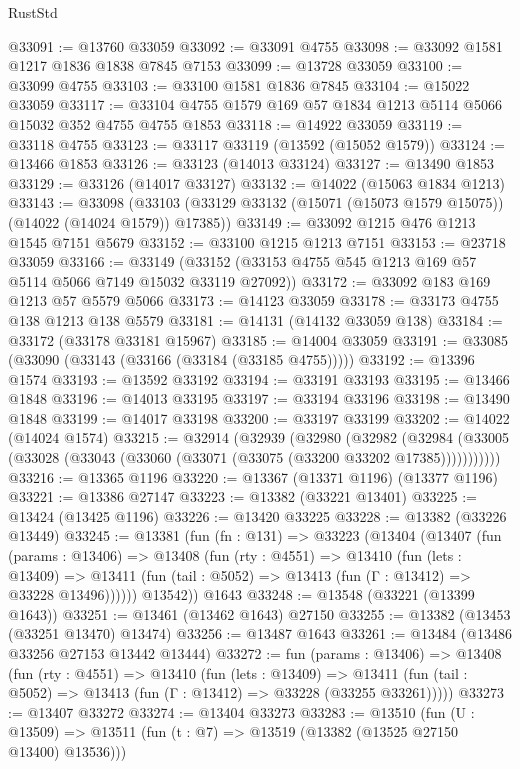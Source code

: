 \begin{lexlean}{RustStd}
\begin{coremodule}
@33091 := @13760 @33059
@33092 := @33091 @4755
@33098 := @33092 @1581 @1217 @1836 @1838 @7845 @7153
@33099 := @13728 @33059
@33100 := @33099 @4755
@33103 := @33100 @1581 @1836 @7845
@33104 := @15022 @33059
@33117 := @33104 @4755 @1579 @169 @57 @1834 @1213 @5114 @5066 @15032 @352 @4755 @4755 @1853
@33118 := @14922 @33059
@33119 := @33118 @4755
@33123 := @33117 @33119 (@13592 (@15052 @1579))
@33124 := @13466 @1853
@33126 := @33123 (@14013 @33124)
@33127 := @13490 @1853
@33129 := @33126 (@14017 @33127)
@33132 := @14022 (@15063 @1834 @1213)
@33143 := @33098
    (@33103 (@33129 @33132 (@15071 (@15073 @1579 @15075)) (@14022 (@14024 @1579)) @17385))
@33149 := @33092 @1215 @476 @1213 @1545 @7151 @5679
@33152 := @33100 @1215 @1213 @7151
@33153 := @23718 @33059
@33166 := @33149 (@33152 (@33153 @4755 @545 @1213 @169 @57 @5114 @5066 @7149 @15032 @33119 @27092))
@33172 := @33092 @183 @169 @1213 @57 @5579 @5066
@33173 := @14123 @33059
@33178 := @33173 @4755 @138 @1213 @138 @5579
@33181 := @14131 (@14132 @33059 @138)
@33184 := @33172 (@33178 @33181 @15967)
@33185 := @14004 @33059
@33191 := @33085 (@33090 (@33143 (@33166 (@33184 (@33185 @4755)))))
@33192 := @13396 @1574
@33193 := @13592 @33192
@33194 := @33191 @33193
@33195 := @13466 @1848
@33196 := @14013 @33195
@33197 := @33194 @33196
@33198 := @13490 @1848
@33199 := @14017 @33198
@33200 := @33197 @33199
@33202 := @14022 (@14024 @1574)
@33215 := @32914
    (@32939
      (@32980
        (@32982
          (@32984 (@33005 (@33028 (@33043 (@33060 (@33071 (@33075 (@33200 @33202 @17385)))))))))))
@33216 := @13365 @1196
@33220 := @13367 (@13371 @1196) (@13377 @1196)
@33221 := @13386 @27147
@33223 := @13382 (@33221 @13401)
@33225 := @13424 (@13425 @1196)
@33226 := @13420 @33225
@33228 := @13382 (@33226 @13449)
@33245 := @13381
    (fun (fn : @131) =>
    @33223
      (@13404
        (@13407
          (fun (params : @13406) =>
          @13408
            (fun (rty : @4551) =>
            @13410
              (fun (lets : @13409) =>
              @13411 (fun (tail : @5052) => @13413 (fun (Γ : @13412) => @33228 @13496))))))
        @13542))
    @1643
@33248 := @13548 (@33221 (@13399 @1643))
@33251 := @13461 (@13462 @1643) @27150
@33255 := @13382 (@13453 (@33251 @13470) @13474)
@33256 := @13487 @1643
@33261 := @13484 (@13486 @33256 @27153 @13442 @13444)
@33272 := fun (params : @13406) =>
  @13408
    (fun (rty : @4551) =>
    @13410
      (fun (lets : @13409) =>
      @13411 (fun (tail : @5052) => @13413 (fun (Γ : @13412) => @33228 (@33255 @33261)))))
@33273 := @13407 @33272
@33274 := @13404 @33273
@33283 := @13510
    (fun (U : @13509) => @13511 (fun (t : @7) => @13519 (@13382 (@13525 @27150 @13400) @13536)))

\end{coremodule}
\end{lexlean}
